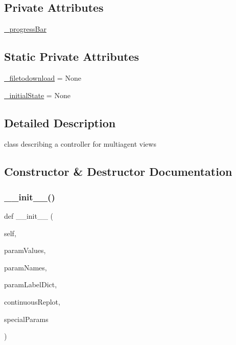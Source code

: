 \subsection*{Private Attributes}
\begin{DoxyCompactItemize}
\item 
\hyperlink{class_mu_mo_t_1_1_mu_mo_tmultiagent_controller_a018864aa22d2adb0d3958fb0adbce8e2}{\+\_\+progress\+Bar}
\end{DoxyCompactItemize}
\subsection*{Static Private Attributes}
\begin{DoxyCompactItemize}
\item 
\hyperlink{class_mu_mo_t_1_1_mu_mo_tmultiagent_controller_a559b8292a88eb343bf8591754cf168ef}{\+\_\+filetodownload} = None
\item 
\hyperlink{class_mu_mo_t_1_1_mu_mo_tmultiagent_controller_a8afeb8cf5705c6b521f7d6658dab955b}{\+\_\+initial\+State} = None
\end{DoxyCompactItemize}


\subsection{Detailed Description}
class describing a controller for multiagent views 

\subsection{Constructor \& Destructor Documentation}
\mbox{\label{class_mu_mo_t_1_1_mu_mo_tmultiagent_controller_a203e76c007a565312c5715712851aadb}} 
\subsubsection{\texorpdfstring{\+\_\+\+\_\+init\+\_\+\+\_\+()}{\_\_init\_\_()}}
{\footnotesize\ttfamily def \+\_\+\+\_\+init\+\_\+\+\_\+ (\begin{DoxyParamCaption}\item[{}]{self,  }\item[{}]{param\+Values,  }\item[{}]{param\+Names,  }\item[{}]{param\+Label\+Dict,  }\item[{}]{continuous\+Replot,  }\item[{}]{special\+Params }\end{DoxyParamCaption})}



